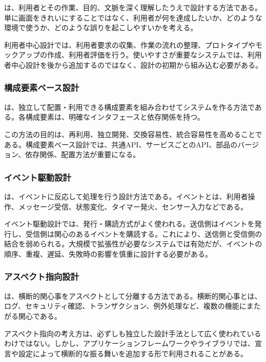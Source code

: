 \documentclass[a4paper,11pt]{ltjsarticle}
\numberwithin{figure}{section}
\numberwithin{table}{section}
\begin{document}
 は、利用者とその作業、目的、文脈を深く理解したうえで設計する方法である。単に画面をきれいにすることではなく、利用者が何を達成したいか、どのような環境で使うか、どのような誤りを起こしやすいかを考える。

利用者中心設計では、利用者要求の収集、作業の流れの整理、プロトタイプやモックアップの作成、利用者評価を行う。使いやすさが重要なシステムでは、利用者中心設計を後から追加するのではなく、設計の初期から組み込む必要がある。

\subsubsection{構成要素ベース設計}

 は、独立して配置・利用できる構成要素を組み合わせてシステムを作る方法である。各構成要素は、明確なインタフェースと依存関係を持つ。

この方法の目的は、再利用、独立開発、交換容易性、統合容易性を高めることである。構成要素ベース設計では、共通API、サービスごとのAPI、部品のバージョン、依存関係、配置方法が重要になる。

\subsubsection{イベント駆動設計}

 は、イベントに反応して処理を行う設計方法である。イベントとは、利用者操作、メッセージ受信、状態変化、タイマー発火、センサー入力などである。

イベント駆動設計では、発行・購読方式がよく使われる。送信側はイベントを発行し、受信側は関心のあるイベントを購読する。これにより、送信側と受信側の結合を弱められる。大規模で拡張性が必要なシステムでは有効だが、イベントの順序、重複、遅延、失敗時の影響を慎重に設計する必要がある。

\subsubsection{アスペクト指向設計}

 は、横断的関心事をアスペクトとして分離する方法である。横断的関心事とは、ログ、セキュリティ確認、トランザクション、例外処理など、複数の機能にまたがる関心である。

アスペクト指向の考え方は、必ずしも独立した設計手法として広く使われているわけではない。しかし、アプリケーションフレームワークやライブラリでは、宣言や設定によって横断的な振る舞いを追加する形で利用されることがある。
\end{document}
